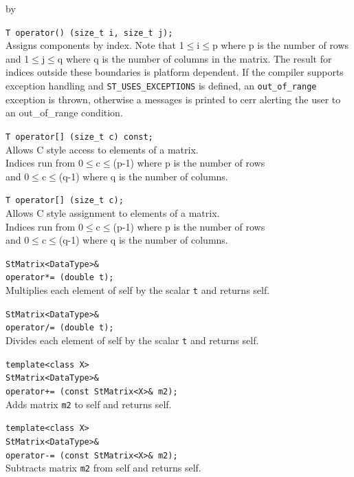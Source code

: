 \documentclass[twoside]{article}
\newcommand{\comp}[1]{\texttt{#1}}%
\newcommand{\entrylabel}[1]{\mbox{\textbf{{#1}}}\hfil}%
\newenvironment{entry}
{\begin{list}{}%
    {\renewcommand{\makelabel}{\entrylabel}%
     \setlength{\labelwidth}{90pt}%
     \setlength{\leftmargin}{\labelwidth}
     \advance\leftmargin by \labelsep%
      }%
    }%
  {\end{list}}
\newcommand{\Entrylabel}[1]%
{\raisebox{0pt}[1ex][0pt]{\makebox[\labelwidth][l]%
    {\parbox[t]{\labelwidth}{\hspace{0pt}\textbf{{#1}}}}}}
\newenvironment{Entry}%
{\renewcommand{\entrylabel}{\Entrylabel}\begin{entry}}%
  {\end{entry}}
\begin{document}
\begin{Entry}
    \verb+T operator() (size_t i, size_t j);+\\
    Assigns components by index. Note that 1$\leq$i$\leq$p where p
    is the number of rows and 1$\leq$j$\leq$q where q is
    the number of columns in the matrix.  The result for
    indices outside these boundaries is platform
    dependent. If the compiler supports exception handling and
    \comp{ST\_USES\_EXCEPTIONS} is defined, an
    \comp{out\_of\_range} exception is thrown, otherwise a
    messages is printed to cerr alerting the user to an out\_of\_range
    condition.
    
    \verb+T operator[] (size_t c) const;+\\
    Allows C style access to elements of a matrix. \\
    Indices run from  0$\leq$c$\leq$(p-1) where p is the
    number of rows \\
    and 0$\leq$c$\leq$(q-1) where q is the number of columns.

    \verb+T operator[] (size_t c);+\\
    Allows C style assignment to elements of a matrix. \\
    Indices run from  0$\leq$c$\leq$(p-1) where p is the
    number of rows \\
    and 0$\leq$c$\leq$(q-1) where q is the number of columns.
    
    \verb+StMatrix<DataType>&+\\
    \verb+operator*= (double t);+\\
    Multiplies each element of self by the scalar \comp{t}
    and returns self.
    
    \verb+StMatrix<DataType>&+\\
    \verb+operator/= (double t);+\\
    Divides each element of self by the scalar \comp{t}
    and returns self.
    
    \verb+template<class X>+\\
    \verb+StMatrix<DataType>&+\\
    \verb#operator+= (const StMatrix<X>& m2);#\\
    Adds matrix \comp{m2} to self and returns self.
    
    \verb+template<class X>+\\
    \verb+StMatrix<DataType>&+\\
    \verb+operator-= (const StMatrix<X>& m2);+\\
    Subtracts matrix \comp{m2} from self and returns self.


\end{Entry}
\end{document}
